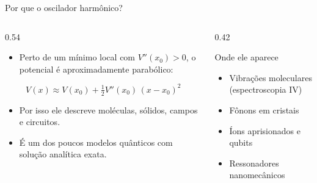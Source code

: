\begin{frame}{Por que o oscilador harmônico?}
  \begin{columns}[T,onlytextwidth]
    \begin{column}{0.54\textwidth}
      \begin{itemize}
        \item Perto de um mínimo local com \alert{$V''(x_0)>0$},
              o potencial é aproximadamente parabólico:
      \end{itemize}
      \begin{equacao}
        \[
          V(x) \approx V(x_0)
          + \tfrac12 V''(x_0)\,(x-x_0)^2
        \]
      \end{equacao}
      \begin{itemize}
        \item Por isso ele descreve \alert{moléculas}, \alert{sólidos},
              \alert{campos} e \alert{circuitos}.
        \item É um dos poucos modelos quânticos com solução
              \alert{analítica exata}.
      \end{itemize}
    \end{column}
    \begin{column}{0.42\textwidth}
      \begin{destaque}{Onde ele aparece}
        \begin{itemize}
          \item Vibrações moleculares (espectroscopia IV)
          \item Fônons em cristais
          \item Íons aprisionados e qubits
          \item Ressonadores nanomecânicos
        \end{itemize}
      \end{destaque}
    \end{column}
  \end{columns}
\end{frame}
